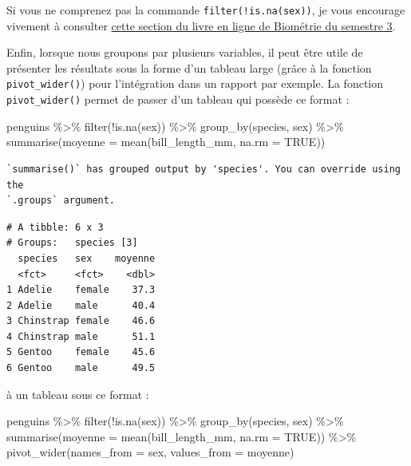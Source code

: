 \documentclass[
  a4paper,
  DIV=11,
  numbers=noendperiod,
  oneside]{scrreprt}
\newenvironment{Shaded}{}{}
\newcommand{\AttributeTok}[1]{\textcolor[rgb]{0.84,0.23,0.29}{#1}}
\newcommand{\ConstantTok}[1]{\textcolor[rgb]{0.00,0.36,0.77}{#1}}
\newcommand{\FunctionTok}[1]{\textcolor[rgb]{0.44,0.26,0.76}{#1}}
\newcommand{\NormalTok}[1]{\textcolor[rgb]{0.14,0.16,0.18}{#1}}
\newcommand{\SpecialCharTok}[1]{\textcolor[rgb]{0.00,0.36,0.77}{#1}}
\begin{document}
Si vous ne comprenez pas la commande \texttt{filter(!is.na(sex))}, je
vous encourage vivement à consulter
\href{https://besibo.github.io/BiometrieS3/04-DataWrangling.html\#filtrer-des-lignes-avec-filter}{cette
section du livre en ligne de Biométrie du semestre 3}.

Enfin, lorsque nous groupons par plusieurs variables, il peut être utile
de présenter les résultats sous la forme d'un tableau large (grâce à la
fonction \texttt{pivot\_wider()}) pour l'intégration dans un rapport par
exemple. La fonction \texttt{pivot\_wider()} permet de passer d'un
tableau qui possède ce format :

\begin{Shaded}
\begin{Highlighting}[]
\NormalTok{penguins }\SpecialCharTok{\%\textgreater{}\%}
  \FunctionTok{filter}\NormalTok{(}\SpecialCharTok{!}\FunctionTok{is.na}\NormalTok{(sex)) }\SpecialCharTok{\%\textgreater{}\%} 
  \FunctionTok{group\_by}\NormalTok{(species, sex) }\SpecialCharTok{\%\textgreater{}\%}
  \FunctionTok{summarise}\NormalTok{(}\AttributeTok{moyenne =} \FunctionTok{mean}\NormalTok{(bill\_length\_mm, }\AttributeTok{na.rm =} \ConstantTok{TRUE}\NormalTok{))}
\end{Highlighting}
\end{Shaded}

\begin{verbatim}
`summarise()` has grouped output by 'species'. You can override using the
`.groups` argument.
\end{verbatim}

\begin{verbatim}
# A tibble: 6 x 3
# Groups:   species [3]
  species   sex    moyenne
  <fct>     <fct>    <dbl>
1 Adelie    female    37.3
2 Adelie    male      40.4
3 Chinstrap female    46.6
4 Chinstrap male      51.1
5 Gentoo    female    45.6
6 Gentoo    male      49.5
\end{verbatim}

à un tableau sous ce format :

\begin{Shaded}
\begin{Highlighting}[]
\NormalTok{penguins }\SpecialCharTok{\%\textgreater{}\%}
  \FunctionTok{filter}\NormalTok{(}\SpecialCharTok{!}\FunctionTok{is.na}\NormalTok{(sex)) }\SpecialCharTok{\%\textgreater{}\%} 
  \FunctionTok{group\_by}\NormalTok{(species, sex) }\SpecialCharTok{\%\textgreater{}\%}
  \FunctionTok{summarise}\NormalTok{(}\AttributeTok{moyenne =} \FunctionTok{mean}\NormalTok{(bill\_length\_mm, }\AttributeTok{na.rm =} \ConstantTok{TRUE}\NormalTok{)) }\SpecialCharTok{\%\textgreater{}\%} 
  \FunctionTok{pivot\_wider}\NormalTok{(}\AttributeTok{names\_from =}\NormalTok{ sex,}
              \AttributeTok{values\_from =}\NormalTok{ moyenne)}
\end{Highlighting}
\end{Shaded}
\end{document}
